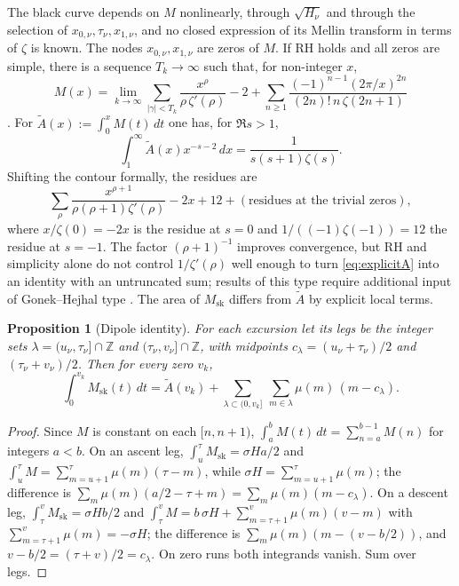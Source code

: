 \documentclass[11pt]{amsart}
\numberwithin{equation}{section}
\theoremstyle{plain}
\newtheorem{proposition}[theorem]{Proposition}
\theoremstyle{definition}
\theoremstyle{remark}
\newcommand{\Msk}{M_{\mathrm{sk}}}
\begin{document}
The black curve depends on $M$ nonlinearly, through $\sqrt{H_\nu}$ and
through the selection of $x_{0,\nu},\tau_\nu,x_{1,\nu}$, and no closed
expression of its Mellin transform in terms of $\zeta$ is known. The nodes
$x_{0,\nu},x_{1,\nu}$ are zeros of $M$. If RH holds and all zeros are
simple, there is a sequence $T_k\to\infty$ such that, for non-integer $x$,
\begin{equation}
\label{eq:explicitM}
  M(x)=\lim_{k\to\infty}\sum_{|\gamma|<T_k}\frac{x^\rho}{\rho\,\zeta'(\rho)}-2
  +\sum_{n\ge1}\frac{(-1)^{n-1}(2\pi/x)^{2n}}{(2n)!\,n\,\zeta(2n+1)}
\end{equation}
\cite[\S14.27]{Titchmarsh1986}. For $\widetilde{A}(x):=\int_0^xM(t)\,dt$ one
has, for $\Re s>1$,
\begin{equation}
\label{eq:mellin_A}
  \int_1^\infty \widetilde{A}(x)x^{-s-2}\,dx=\frac{1}{s(s+1)\zeta(s)}.
\end{equation}
Shifting the contour formally, the residues are
\begin{equation}
\label{eq:explicitA}
  \sum_\rho\frac{x^{\rho+1}}{\rho(\rho+1)\zeta'(\rho)}-2x+12
  +(\text{residues at the trivial zeros}),
\end{equation}
where $x/\zeta(0)=-2x$ is the residue at $s=0$ and
$1/((-1)\zeta(-1))=12$ the residue at $s=-1$. The factor $(\rho+1)^{-1}$
improves convergence, but RH and simplicity alone do not control
$1/\zeta'(\rho)$ well enough to turn \eqref{eq:explicitA} into an identity
with an untruncated sum; results of this type require additional input of
Gonek--Hejhal type \cite{Ng2004}. The area of $\Msk$ differs from
$\widetilde A$ by explicit local terms.

\begin{proposition}[Dipole identity]
\label{prop:dipoles}
For each excursion let its \emph{legs} be the integer sets
$\lambda=(u_\nu,\tau_\nu]\cap\mathbb{Z}$ and
$(\tau_\nu,v_\nu]\cap\mathbb{Z}$, with midpoints $c_\lambda=(u_\nu+\tau_\nu)/2$
and $(\tau_\nu+v_\nu)/2$. Then for every zero $v_k$,
\begin{equation}
\label{eq:dipoles}
  \int_0^{v_k}\Msk(t)\,dt=\widetilde{A}(v_k)
  +\sum_{\lambda\subset(0,v_k]}\ \sum_{m\in\lambda}\mu(m)\,(m-c_\lambda).
\end{equation}
\end{proposition}

\begin{proof}
Since $M$ is constant on each $[n,n+1)$, $\int_a^bM(t)\,dt=\sum_{n=a}^{b-1}M(n)$
for integers $a<b$. On an ascent leg, $\int_{u}^{\tau}\Msk=\sigma H a/2$ and
$\int_u^\tau M=\sum_{m=u+1}^{\tau}\mu(m)(\tau-m)$, while
$\sigma H=\sum_{m=u+1}^{\tau}\mu(m)$; the difference is
$\sum_m\mu(m)(a/2-\tau+m)=\sum_m\mu(m)(m-c_\lambda)$. On a descent leg,
$\int_\tau^v\Msk=\sigma Hb/2$ and
$\int_\tau^vM=b\,\sigma H+\sum_{m=\tau+1}^{v}\mu(m)(v-m)$ with
$\sum_{m=\tau+1}^{v}\mu(m)=-\sigma H$; the difference is
$\sum_m\mu(m)(m-(v-b/2))$, and $v-b/2=(\tau+v)/2=c_\lambda$. On zero runs
both integrands vanish. Sum over legs.
\end{proof}
\end{document}
